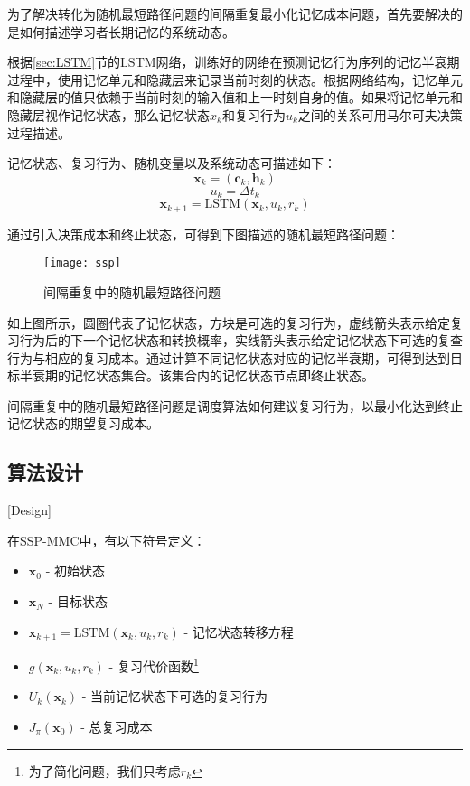 为了解决转化为随机最短路径问题的间隔重复最小化记忆成本问题，首先要解决的是如何描述学习者长期记忆的系统动态。

根据\ref{sec:LSTM}节的LSTM网络，训练好的网络在预测记忆行为序列的记忆半衰期过程中，使用记忆单元和隐藏层来记录当前时刻的状态。根据网络结构，记忆单元和隐藏层的值只依赖于当前时刻的输入值和上一时刻自身的值。如果将记忆单元和隐藏层视作记忆状态，那么记忆状态$x_k$和复习行为$u_k$之间的关系可用马尔可夫决策过程描述。

记忆状态、复习行为、随机变量以及系统动态可描述如下：
\begin{equation}
\boldsymbol x_k = (\boldsymbol c_k,\boldsymbol h_k)
\end{equation}
\begin{equation}
u_{k}=\Delta t_{k}
\end{equation}
\begin{equation}
\boldsymbol x_{k+1}=\mathrm{LSTM}(\boldsymbol x_k,u_k,r_k)
\end{equation}

通过引入决策成本和终止状态，可得到下图描述的随机最短路径问题：

\begin{figure}[htpb]
    \centering
    \texttt{[image: ssp]}
    \caption{间隔重复中的随机最短路径问题}
\end{figure}

如上图所示，圆圈代表了记忆状态，方块是可选的复习行为，虚线箭头表示给定复习行为后的下一个记忆状态和转换概率，实线箭头表示给定记忆状态下可选的复查行为与相应的复习成本。通过计算不同记忆状态对应的记忆半衰期，可得到达到目标半衰期的记忆状态集合。该集合内的记忆状态节点即终止状态。

间隔重复中的随机最短路径问题是调度算法如何建议复习行为，以最小化达到终止记忆状态的期望复习成本。

\subsection{算法设计}[Design]

在SSP-MMC中，有以下符号定义：

\begin{itemize}
    \item $\boldsymbol x_0$ - 初始状态
    \item $\boldsymbol x_{N}$ - 目标状态
    \item $\boldsymbol x_{k+1} = \mathrm{LSTM}(\boldsymbol x_k,u_k,r_k)$ - 记忆状态转移方程
    \item $g(\boldsymbol x_k,u_k,r_k)$ - 复习代价函数\footnote{为了简化问题，我们只考虑$r_k$}
    \item $U_k(\boldsymbol x_k)$ - 当前记忆状态下可选的复习行为
    \item $J_\pi(\boldsymbol x_0)$ - 总复习成本
\end{itemize}

